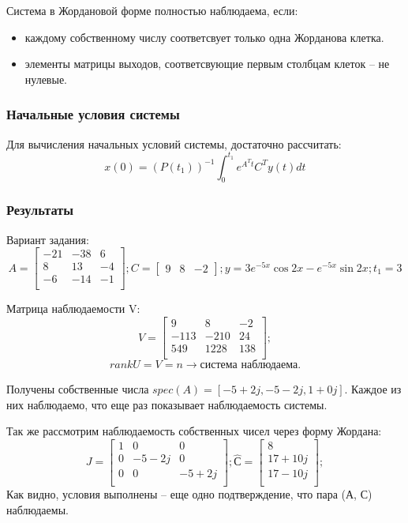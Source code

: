 Система в Жордановой форме полностью наблюдаема, если:
\begin{itemize}
    \item каждому собственному числу соответсвует только одна Жорданова клетка. 
    \item элементы матрицы выходов, соответсвующие первым столбцам клеток -- не нулевые.
\end{itemize}

\subsubsection{Начальные условия системы}
Для вычисления начальных условий системы, достаточно рассчитать:
\[x(0) = (P(t_1))^{-1} \int_{0}^{t_1} e^{A^T t} C^T y(t) dt\]


\subsubsection{Результаты}
Вариант задания:
\[ A = \begin{bmatrix}
        -21 & -38 & 6 \\
        8 & 13 & -4 \\
        -6 & -14 & -1 \\
        \end{bmatrix}; 
        C = \begin{bmatrix}
                9  & 8 & -2
                \end{bmatrix}; 
        y = 3 e^{-5x}\cos{2x} - e^{-5x}\sin{2x}; 
        t_1 = 3
\]

Матрица наблюдаемости V:
\[ V = \begin{bmatrix}
        9 & 8 & -2 \\
        -113 & -210 & 24 \\
        549 & 1228 & 138 \\
        \end{bmatrix};
\]
\[rankU = V = n \rightarrow \text{система наблюдаема.}\]

Получены собственные числа \(spec(A) = [-5 + 2j, -5 - 2j, 1+0j]\). Каждое из них наблюдаемо, что еще раз показывает наблюдаемость системы.

Так же рассмотрим наблюдаемость собственных чисел через форму Жордана:
\[
        J = \begin{bmatrix}
                1 & 0 & 0 \\
                0 & -5 - 2j & 0 \\
                0 & 0 & -5 + 2j \\
                \end{bmatrix};
        \hat{С} = \begin{bmatrix}
                8 \\
                17 + 10j \\
                17 - 10j \\
                \end{bmatrix};
\]
Как видно, условия выполнены -- еще одно подтверждение, что пара (А, С) наблюдаемы.

